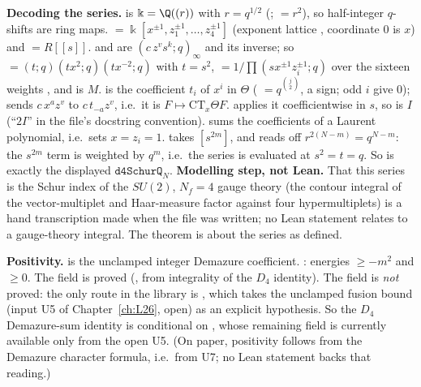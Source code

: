 \begin{dictionary}
\textbf{Decoding the series.}  is $\Bbbk=\Q((r))$ with $r=q^{1/2}$ (;  $=r^2$), so
half-integer $q$-shifts are ring maps.  $=\Bbbk[x^{\pm1},z_1^{\pm1},\dots,z_4^{\pm1}]$ (exponent lattice
, coordinate $0$ is $x$) and  $=R[[s]]$.  and  are
$(c\,z^vs^k;q)_\infty$ and its inverse; so  $=(t;q)(tx^2;q)(tx^{-2};q)$ with $t=s^2$, 
$=1/\prod(sx^{\pm1}z_i^{\pm1};q)$ over the sixteen weights , and  is $M$.
 is the coefficient $t_i$ of $x^i$ in $\Theta$ ( $=q^{\binom j2}$,  a sign; odd
$i$ give $0$);  sends $c\,x^az^v$ to $c\,t_{-a}z^v$, i.e.\ it is $F\mapsto\mathrm{CT}_x\Theta F$.
 applies it coefficientwise in $s$, so  is $I$ (``$2I$'' in the file's docstring
convention).  sums the coefficients of a Laurent polynomial, i.e.\ sets $x=z_i=1$. 
takes $[s^{2m}]$, and  reads off $r^{2(N-m)}=q^{N-m}$: the $s^{2m}$ term is weighted by
$q^m$, i.e.\ the series is evaluated at $s^2=t=q$. So  is exactly the displayed
$\mathtt{d4SchurQ}_N$. \textbf{Modelling step, not Lean.} That this series is the Schur index of the $SU(2)$,
$N_f=4$ gauge theory (the contour integral of the vector-multiplet and Haar-measure factor against four
hypermultiplets) is a hand transcription made when the file was written; no Lean statement relates
 to a gauge-theory integral. The theorem is about the series as defined.

\textbf{Positivity.}  is the unclamped integer Demazure coefficient. :
energies $\ge-m^2$ and $\ge0$. The  field is proved (, from
integrality of the $D_4$ identity). The  field is \emph{not} proved: the only route in the library is
, which takes the unclamped fusion bound  (input U5 of
Chapter~\ref{ch:L26}, open) as an explicit hypothesis. So the $D_4$ Demazure-sum identity is conditional on
, whose remaining field is currently available only from the open U5. (On paper, positivity
follows from the Demazure character formula, i.e.\ from U7; no Lean statement backs that reading.)
\end{dictionary}
